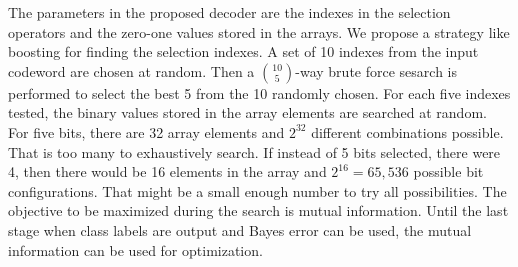 \documentclass{article}
\begin{document}
The parameters in the proposed decoder are the indexes in the selection operators and the zero-one values stored in the arrays.  We propose a strategy like boosting for finding the selection indexes.  A set of 10 indexes from the input codeword are chosen at random.  Then a ${10 \choose 5}$-way brute force sesarch is performed to select the best 5 from the 10 randomly chosen.  For each five indexes tested, the binary values stored in the array elements are searched at random.  For five bits, there are 32 array elements and $2^{32}$ different combinations possible.  That is too many to exhaustively search.  If instead of 5 bits selected, there were 4, then there would be 16 elements in the array and $2^16=65,536$ possible bit configurations.  That might be a small enough number to try all possibilities.  The objective to be maximized during the search is mutual information.  Until the last stage when class labels are output and Bayes error can be used, the mutual information can be used for optimization.
\end{document}
